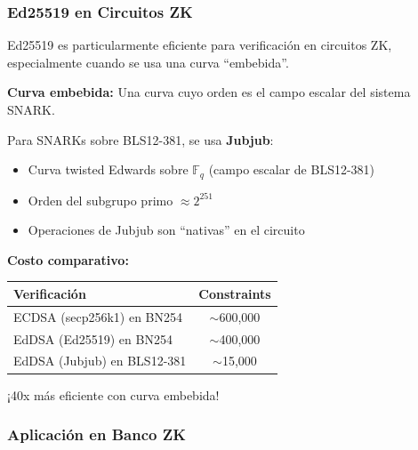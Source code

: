 \documentclass[11pt,a4paper,twoside,openright]{book}
\theoremstyle{definition}
\theoremstyle{plain}
\theoremstyle{remark}
\begin{document}
\subsubsection{Ed25519 en Circuitos ZK}

\begin{mathnote}
Ed25519 es particularmente eficiente para verificación en circuitos ZK, especialmente cuando se usa una curva ``embebida''.

\textbf{Curva embebida:} Una curva cuyo orden es el campo escalar del sistema SNARK.

Para SNARKs sobre BLS12-381, se usa \textbf{Jubjub}:
\begin{itemize}
    \item Curva twisted Edwards sobre $\mathbb{F}_q$ (campo escalar de BLS12-381)
    \item Orden del subgrupo primo $\approx 2^{251}$
    \item Operaciones de Jubjub son ``nativas'' en el circuito
\end{itemize}

\textbf{Costo comparativo:}
\begin{center}
\begin{tabular}{lc}
\toprule
\textbf{Verificación} & \textbf{Constraints} \\
\midrule
ECDSA (secp256k1) en BN254 & $\sim$600,000 \\
EdDSA (Ed25519) en BN254 & $\sim$400,000 \\
EdDSA (Jubjub) en BLS12-381 & $\sim$15,000 \\
\bottomrule
\end{tabular}
\end{center}

¡40x más eficiente con curva embebida!
\end{mathnote}

\subsubsection{Aplicación en Banco ZK}
\end{document}

